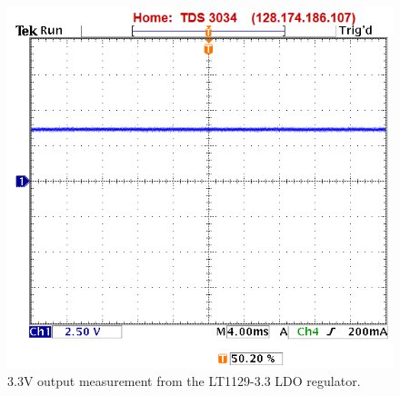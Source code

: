 \begin{figure}
\centering
\includegraphics[width=.8\textwidth]{main_3_3v_output.png}
\caption{3.3V output measurement from the LT1129-3.3 LDO regulator.}
\label{fig:main_3_3v_output}
\end{figure}

